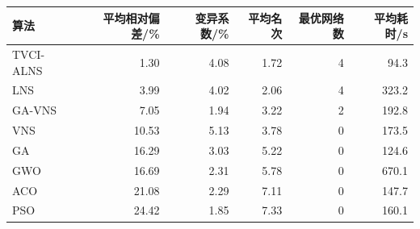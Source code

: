 \begin{tabular*}{0.92\linewidth}{@{\extracolsep{\fill}}lrrrrr@{}}
\toprule
算法 & 平均相对偏差/\% & 变异系数/\% & 平均名次 & 最优网络数 & 平均耗时/s \\
\midrule
TVCI-ALNS & 1.30 & 4.08 & 1.72 & 4 & 94.3 \\
LNS & 3.99 & 4.02 & 2.06 & 4 & 323.2 \\
GA-VNS & 7.05 & 1.94 & 3.22 & 2 & 192.8 \\
VNS & 10.53 & 5.13 & 3.78 & 0 & 173.5 \\
GA & 16.29 & 3.03 & 5.22 & 0 & 124.6 \\
GWO & 16.69 & 2.31 & 5.78 & 0 & 670.1 \\
ACO & 21.08 & 2.29 & 7.11 & 0 & 147.7 \\
PSO & 24.42 & 1.85 & 7.33 & 0 & 160.1 \\
\bottomrule
\end{tabular*}
